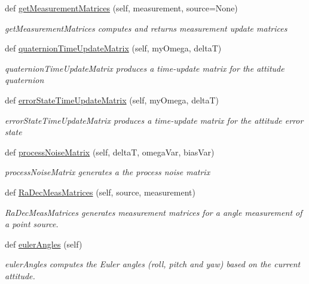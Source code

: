 \begin{DoxyCompactItemize}
def \hyperlink{classAttitudeSubstate_1_1AttitudeState6DOF_a81f4c417a0f6f0ecf0478fc885bbd79f}{get\+Measurement\+Matrices} (self, measurement, source=None)
\begin{DoxyCompactList}\small\item\em get\+Measurement\+Matrices computes and returns measurement update matrices \end{DoxyCompactList}\item 
def \hyperlink{classAttitudeSubstate_1_1AttitudeState6DOF_aada43a81dfe3ae7b1a22dd24220062e8}{quaternion\+Time\+Update\+Matrix} (self, my\+Omega, deltaT)
\begin{DoxyCompactList}\small\item\em quaternion\+Time\+Update\+Matrix produces a time-\/update matrix for the attitude quaternion \end{DoxyCompactList}\item 
def \hyperlink{classAttitudeSubstate_1_1AttitudeState6DOF_a98463a04f2b7f78389d7cce944139afd}{error\+State\+Time\+Update\+Matrix} (self, my\+Omega, deltaT)
\begin{DoxyCompactList}\small\item\em error\+State\+Time\+Update\+Matrix produces a time-\/update matrix for the attitude error state \end{DoxyCompactList}\item 
def \hyperlink{classAttitudeSubstate_1_1AttitudeState6DOF_abc5b2c8345bcd948d35b438fce184dee}{process\+Noise\+Matrix} (self, deltaT, omega\+Var, bias\+Var)
\begin{DoxyCompactList}\small\item\em process\+Noise\+Matrix generates a the process noise matrix \end{DoxyCompactList}\item 
def \hyperlink{classAttitudeSubstate_1_1AttitudeState6DOF_a3292931688716329fb80cbeac83f7ee7}{Ra\+Dec\+Meas\+Matrices} (self, source, measurement)
\begin{DoxyCompactList}\small\item\em Ra\+Dec\+Meas\+Matrices generates measurement matrices for a angle measurement of a point source. \end{DoxyCompactList}\item 
def \hyperlink{classAttitudeSubstate_1_1AttitudeState6DOF_a34f52f0e701e78ba8e92bff57f56110d}{euler\+Angles} (self)
\begin{DoxyCompactList}\small\item\em euler\+Angles computes the Euler angles (roll, pitch and yaw) based on the current attitude. \end{DoxyCompactList}\item 

\end{DoxyCompactItemize}

